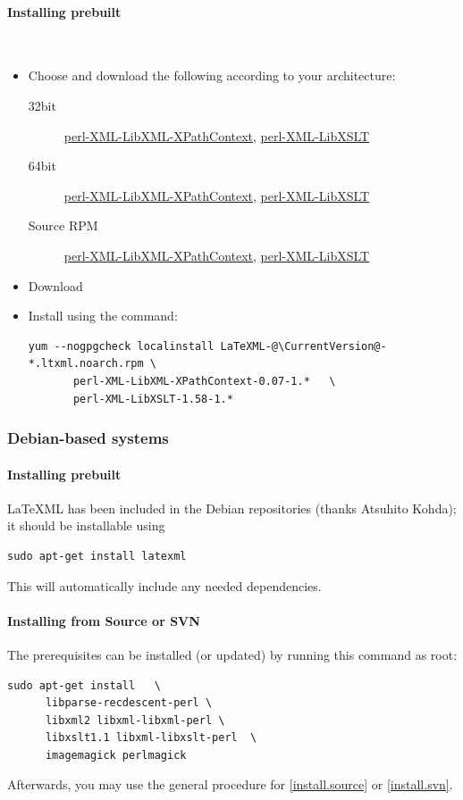 \documentclass{article}
\begin{document}
\paragraph{Installing prebuilt}\\
\begin{itemize}
\item Choose and download the following according to your architecture:
\begin{description}
\item[32bit]
   \href{releases/perl-XML-LibXML-XPathContext-0.07-1.c5.ltxml.i386.rpm}{perl-XML-LibXML-XPathContext},
   \href{releases/perl-XML-LibXSLT-1.58-1.c5.ltxml.i386.rpm}{perl-XML-LibXSLT}
\item[64bit]
   \href{releases/perl-XML-LibXML-XPathContext-0.07-1.c5.ltxml.x86_64.rpm}{perl-XML-LibXML-XPathContext},
   \href{releases/perl-XML-LibXSLT-1.58-1.c5.ltxml.x86_64.rpm}{perl-XML-LibXSLT}
\item[Source RPM]
    \href{releases/perl-XML-LibXML-XPathContext-0.07-1.c5.ltxml.src.rpm}{perl-XML-LibXML-XPathContext},
    \href{releases/perl-XML-LibXSLT-1.58-1.c5.ltxml.src.rpm}{perl-XML-LibXSLT}
\end{description}
\item Download \CurrentCentos
\item Install using the command:
\begin{lstlisting}[style=shell]
   yum --nogpgcheck localinstall LaTeXML-@\CurrentVersion@-*.ltxml.noarch.rpm \
       perl-XML-LibXML-XPathContext-0.07-1.*   \
       perl-XML-LibXSLT-1.58-1.*
\end{lstlisting}
\end{itemize}

\subsubsection{Debian-based systems}\label{install.debian}
\paragraph{Installing prebuilt}
LaTeXML has been included in the Debian repositories (thanks Atsuhito Kohda);
it should be installable using
\begin{lstlisting}[style=shell]
  sudo apt-get install latexml
\end{lstlisting}
This will automatically include any needed dependencies.

\paragraph{Installing from Source or SVN}
The prerequisites can be installed (or updated) by running this command as root: 
\begin{lstlisting}[style=shell]
   sudo apt-get install   \
      libparse-recdescent-perl \
      libxml2 libxml-libxml-perl \
      libxslt1.1 libxml-libxslt-perl  \
      imagemagick perlmagick
\end{lstlisting}
Afterwards, you may use the general procedure for
\ref{install.source} or \ref{install.svn}.
\end{document}
